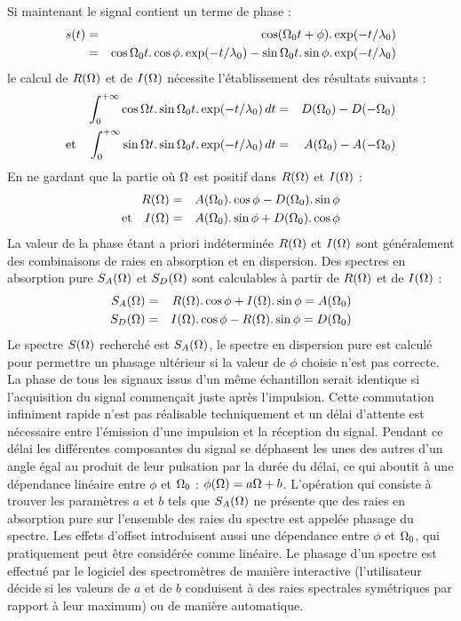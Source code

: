 Si maintenant le signal contient un terme de phase : 
\begin{eqnarray}
s(t) & = & \cos (\Omega_0 t + \phi). \exp(-t/\lambda_0) \\ 
& = & \cos \Omega_0 t . \cos \phi . \exp(-t/\lambda_0) - 
\sin \Omega_0 t . \sin \phi . \exp(-t/\lambda_0)
\end{eqnarray}
le calcul de $R(\Omega)$ et de $I(\Omega)$ 
nécessite l'établissement des résultats suivants :
\begin{eqnarray}
\int_0^{+\infty}  \cos \Omega t . \sin \Omega_0 t . \exp(-t/\lambda_0) \, dt & = &
D(\Omega_0) - D(-\Omega_0) \\
\mbox{et}\quad
\int_0^{+\infty}  \sin \Omega t . \sin \Omega_0 t . \exp(-t/\lambda_0) \, dt & = &
A(\Omega_0) - A(-\Omega_0)
\end{eqnarray}
En ne gardant que la partie où $\Omega$ est positif dans $R(\Omega)$ et $I(\Omega)$ :
\begin{eqnarray}
R(\Omega) & = & A(\Omega_0) . \cos \phi - D(\Omega_0) . \sin \phi \\
\mbox{et}\quad 
I(\Omega) & = & A(\Omega_0) . \sin \phi + D(\Omega_0) . \cos \phi
\end{eqnarray}
La valeur de la phase étant a priori indéterminée $R(\Omega)$ et $I(\Omega)$ sont généralement des 
combinaisons de raies en absorption et en dispersion. 
Des spectres en absorption pure $S_A(\Omega)$ et $S_D(\Omega)$ sont calculables à partir de 
$R(\Omega)$ et de $I(\Omega)$ :
\begin{eqnarray}
S_A(\Omega) & = & R(\Omega) . \cos \phi + I(\Omega) . \sin \phi = A(\Omega_0) \\
S_D(\Omega) & = & I(\Omega) . \cos \phi - R(\Omega) . \sin \phi = D(\Omega_0)
\end{eqnarray}
Le spectre $S(\Omega)$ recherché est $S_A(\Omega)$, 
le spectre en dispersion pure est calculé pour 
permettre un phasage ultérieur si la valeur de $\phi$ choisie n'est pas correcte. 
La phase de tous les signaux issus d'un même échantillon serait identique si 
l'acquisition du signal commençait juste après l'impulsion. 
Cette commutation infiniment rapide n'est pas 
réalisable techniquement et un délai d'attente est nécessaire entre l'émission d'une 
impulsion et la réception du signal. 
Pendant ce délai les différentes composantes du 
signal se déphasent les unes des autres d'un angle égal au produit de leur pulsation par la 
durée du délai, ce qui aboutit à une dépendance linéaire entre $\phi$ et $\Omega_0$ :
$\phi(\Omega) = a\Omega + b$.
L'opération qui consiste à trouver les paramètres $a$ et $b$ tels que 
$S_A(\Omega)$ ne présente que des raies en absorption
pure sur l'ensemble des raies du spectre est appelée phasage du spectre.
Les effets d'offset introduisent aussi une dépendance entre $\phi$ et $\Omega_0$,
qui pratiquement peut être considérée comme linéaire.
Le phasage d'un spectre est effectué par le logiciel des spectromètres de 
manière interactive (l'utilisateur décide si les valeurs de $a$ et de $b$
conduisent à des raies spectrales symétriques par rapport à leur maximum)
ou de manière automatique. 

